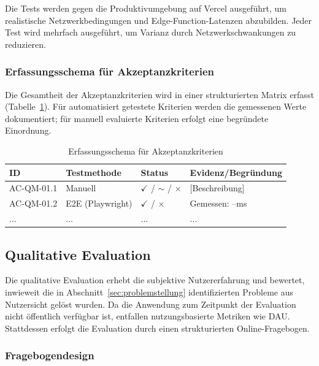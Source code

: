 Die Tests werden gegen die Produktivumgebung auf Vercel ausgeführt, um realistische Netzwerkbedingungen und Edge-Function-Latenzen abzubilden. Jeder Test wird mehrfach ausgeführt, um Varianz durch Netzwerkschwankungen zu reduzieren.

\subsubsection{Erfassungsschema für Akzeptanzkriterien}

Die Gesamtheit der Akzeptanzkriterien wird in einer strukturierten Matrix erfasst (Tabelle~\ref{tab:ac-erfassung-schema}). Für automatisiert getestete Kriterien werden die gemessenen Werte dokumentiert; für manuell evaluierte Kriterien erfolgt eine begründete Einordnung.

\begin{table}[htbp]
\centering
\caption{Erfassungsschema für Akzeptanzkriterien}
\label{tab:ac-erfassung-schema}
\begin{tabular}{lp{3cm}p{2cm}p{4cm}}
\toprule
\textbf{ID} & \textbf{Testmethode} & \textbf{Status} & \textbf{Evidenz/Begründung} \\
\midrule
AC-QM-01.1 & Manuell & $\checkmark$ / $\sim$ / $\times$ & [Beschreibung] \\
AC-QM-01.2 & E2E (Playwright) & $\checkmark$ / $\times$ & Gemessen: --ms \\
... & ... & ... & ... \\
\bottomrule
\end{tabular}
\end{table}

\subsection{Qualitative Evaluation}
\label{sec:qual-eval-durchfuehrung}

Die qualitative Evaluation erhebt die subjektive Nutzererfahrung und bewertet, inwieweit die in Abschnitt~\ref{sec:problemstellung} identifizierten Probleme aus Nutzersicht gelöst wurden. Da die Anwendung zum Zeitpunkt der Evaluation nicht öffentlich verfügbar ist, entfallen nutzungsbasierte Metriken wie \ac{DAU}. Stattdessen erfolgt die Evaluation durch einen strukturierten Online-Fragebogen.

\subsubsection{Fragebogendesign}


